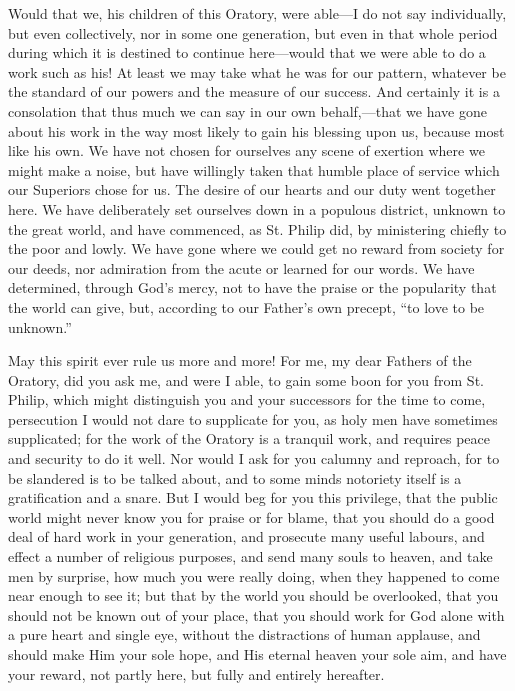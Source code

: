 Would that we, his children of this Oratory, were
able—I do not say individually, but even
collectively, nor in some one generation, but even in
that whole period during which it is destined to continue
here—would that we were able to do a work such as
his! At least we may take what he was for our pattern,
whatever be the standard of our powers and the measure of
our success. And certainly it is a consolation that thus
much we can say in our own behalf,—that we have gone
about his work in the way most likely to gain his
blessing upon us, because most like his own. We have not
chosen for ourselves any scene of exertion where we might
make a noise, but have willingly taken that humble place
of service which our Superiors chose for us. The desire
of our hearts and our duty went together here. We have
deliberately set ourselves down in a populous district,
unknown to the great world, and have commenced, as St.
Philip did, by ministering chiefly to the poor and lowly.
We have gone where we could get no reward from society
for our deeds, nor admiration from the acute or learned
for our words. We have determined, through God's mercy,
not to have the praise or the popularity that the world
can give, but, according to our Father's own precept,
``to love to be unknown.''

May this spirit ever rule us more and more! For me, my
dear Fathers of the Oratory, did you ask me, and were I
able, to gain some boon for you from St. Philip, which
might distinguish you and your successors for the time to
come, persecution I would not dare to supplicate for you,
as holy men have sometimes supplicated; for the work of
the Oratory is a tranquil work, and requires peace and
security to do it well. Nor would I ask for you calumny
and reproach, for to be slandered is to be talked about,
and to some minds notoriety itself is a gratification and
a snare. But I would beg for you this privilege, that the
public world might never know you for praise or for
blame, that you should do a good deal of hard work in
your generation, and prosecute many useful labours, and
effect a number of religious purposes, and send many
souls to heaven, and take men by surprise, how much you
were really doing, when they happened to come near enough
to see it; but that by the world you should be
overlooked, that you should not be known out of your
place, that you should work for God alone with a pure
heart and single eye, without the distractions of human
applause, and should make Him your sole hope, and His
eternal heaven your sole aim, and have your reward, not
partly here, but fully and entirely hereafter.

